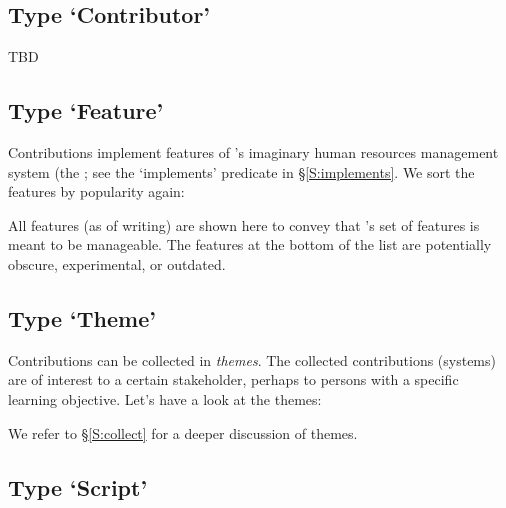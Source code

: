 

\subsection{Type `Contributor'}

TBD


\subsection{Type `Feature'}

Contributions implement features of \ooo{}'s imaginary human resources
management system (the ; see the `implements' predicate in
\S\ref{S:implements}. We sort the features by popularity again:


\noindent
All features (as of writing) are shown here to convey that \ooo{}'s
set of features is meant to be manageable. The features at the bottom
of the list are potentially obscure, experimental, or outdated.



\subsection{Type `Theme'}
\label{S:theme}

Contributions can be collected in \emph{themes}. The collected
contributions (systems) are of interest to a certain stakeholder,
perhaps to persons with a specific learning objective. Let's have a
look at the themes:



\noindent
We refer to \S\ref{S:collect} for a deeper discussion of themes.


\subsection{Type `Script'}

